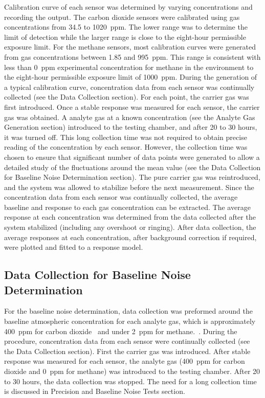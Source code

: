 \documentclass[times]{joehreview}
\begin{document}
	Calibration curve of each sensor was determined by varying concentrations and recording the output.  The carbon dioxide sensors were calibrated using gas concentrations from 34.5 to 1020~ppm.  The lower range was to determine the limit of detection while the larger range is close to the  eight-hour permissible exposure limit.  For the methane sensors, most calibration curves were generated from gas concentrations between 1.85 and 995~ppm. This range is consistent with less than 0~ppm experimental concentration for methane in the environment to the eight-hour permissible exposure limit of 1000~ppm.  During the generation of a typical calibration curve, concentration data from each sensor was continually collected (see the Data Collection section).  For each point, the carrier gas was first introduced.  Once a stable response was measured for each sensor, the carrier gas was obtained.  A analyte gas at a known concentration (see the Analyte Gas Generation section) introduced to the testing chamber, and after 20 to 30 hours, it was turned off.  This long collection time was not required to obtain precise reading of the concentration by each sensor.  However, the collection time was chosen to ensure that significant number of data points were generated to allow a detailed study of the fluctuations around the mean value (see the Data Collection for Baseline Noise Determination section).  The pure carrier gas was reintroduced, and the system was allowed to stabilize before the next measurement. Since the concentration data from each sensor was continually collected, the average baseline and response to each gas concentration can be extracted.  The average response at each concentration was determined from the data collected after the system stabilized (including any overshoot or ringing).  After data collection, the average responses at each concentration, after background correction if required, were plotted and fitted to a response model.  
	
	\subsection*{Data Collection for Baseline Noise Determination}
	\label{sec:method_baseline}
	
	For the baseline noise determination, data collection was preformed around the baseline atmospheric concentration for each analyte gas, which is approximately 400~ppm for carbon dioxide~\cite{blasing_recent_2016,dlugokencky_trends_2016} and under 2~ppm for methane.~\cite{turner_large_2016,bamberger_spatial_2014,dlugokencky_trends_2016-1}.  During the procedure, concentration data from each sensor were continually collected (see the Data Collection section).  First the carrier gas was introduced.  After stable response was measured for each sensor, the analyte gas (400~ppm for carbon dioxide and 0~ppm for methane) was introduced to the testing chamber.  After 20 to 30 hours, the data collection was stopped.  The need for a long collection time is discussed in Precision and Baseline Noise Tests section.
	
\end{document}
